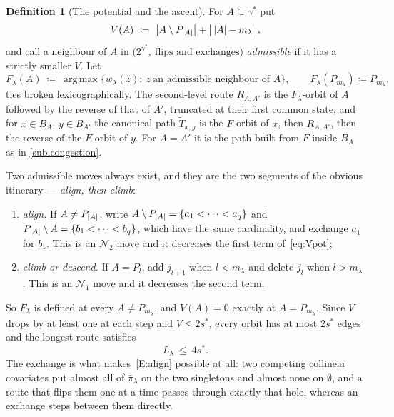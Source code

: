 \documentclass[aos]{imsart}
\DeclarePairedDelimiter{\abs}{\lvert}{\rvert}
\theoremstyle{plain}
\theoremstyle{definition}
\newtheorem{definition}{Definition}[section]
\begin{document}
    \begin{definition}[The potential and the ascent]
        \label{def:eroute}
        For $A\subseteq\gamma^{\ast}$ put
        \begin{equation}
            \label{eq:Vpot}
            V(A)\ \coloneq\
            \bigl|A\setminus P_{\abs A}\bigr|
            +\bigl|\,\abs A-m_\lambda\,\bigr| ,
        \end{equation}
        and call a neighbour of $A$ in
        $\bigl(2^{\gamma^{\ast}},\ \text{flips and exchanges}\bigr)$
        \emph{admissible} if it has a strictly smaller $V$. Let
        \begin{equation}
            \label{eq:ascent}
            F_\lambda(A)\ \coloneq\
            \operatorname*{arg\,max}\bigl\{w_\lambda(z):\
            z\ \text{an admissible neighbour of }A\bigr\},
            \qquad
            F_\lambda(P_{m_\lambda})\coloneq P_{m_\lambda},
        \end{equation}
        ties broken lexicographically. The second-level route $R_{A,A'}$ is
        the $F_\lambda$-orbit of $A$ followed by the reverse of that of
        $A'$, truncated at their first common state; and for $x\in B_A$,
        $y\in B_{A'}$ the canonical path $\widetilde T_{x,y}$ is the
        $F$-orbit of $x$, then $R_{A,A'}$, then the reverse of the $F$-orbit
        of $y$. For $A=A'$ it is the path built from $F$ inside $B_A$ as in
        \cref{sub:congestion}.
    \end{definition}

    Two admissible moves always exist, and they are the two segments of the
    obvious itinerary --- \emph{align, then climb}:
    \begin{enumerate}[label=(E\arabic*),leftmargin=3.4em]
        \item\label{E:align} \emph{align.} If $A\neq P_{\abs A}$, write
        $A\setminus P_{\abs A}=\{a_1<\dots<a_q\}$ and
        $P_{\abs A}\setminus A=\{b_1<\dots<b_q\}$, which have the same
        cardinality, and exchange $a_1$ for $b_1$. This is an
        $\mathcal{N}_2$ move and it decreases the first term
        of~\eqref{eq:Vpot};
        \item\label{E:climb} \emph{climb or descend.} If $A=P_l$, add
        $j_{l+1}$ when $l<m_\lambda$ and delete $j_l$ when $l>m_\lambda$.
        This is an $\mathcal{N}_1$ move and it decreases the second term.
    \end{enumerate}
    So $F_\lambda$ is defined at every $A\neq P_{m_\lambda}$, and
    $V(A)=0$ exactly at $A=P_{m_\lambda}$. Since $V$ drops by at least one
    at each step and $V\leq2s^{\ast}$, every orbit has at most
    $2s^{\ast}$ edges and the longest route satisfies
    \begin{equation}
        \label{eq:Llam}
        L_\lambda\ \leq\ 4s^{\ast} .
    \end{equation}
    The exchange is what makes~\ref{E:align} possible at all: two competing
    collinear covariates put almost all of $\bar\pi_\lambda$ on the two
    singletons and almost none on $\emptyset$, and a route that flips them
    one at a time passes through exactly that hole, whereas an exchange
    steps between them directly.
\end{document}
